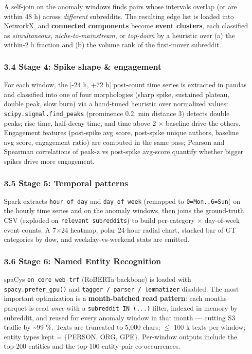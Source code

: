 \documentclass[
]{article}
\begin{document}
A self-join on the anomaly windows finds pairs whose intervals overlap
(or are within 48 h) across \emph{different} subreddits. The resulting
edge list is loaded into NetworkX, and \textbf{connected components}
become \textbf{event clusters}, each classified as \emph{simultaneous},
\emph{niche-to-mainstream}, or \emph{top-down} by a heuristic over (a)
the within-2 h fraction and (b) the volume rank of the first-mover
subreddit.

\subsubsection{3.4 Stage 4: Spike shape \& engagement }

For each window, the {[}-24 h, +72 h{]} post-count time series is
extracted in pandas and classified into one of four morphologies (sharp
spike, sustained plateau, double peak, slow burn) via a hand-tuned
heuristic over normalized values: \texttt{scipy.signal.find\_peaks}
(prominence 0.2, min distance 3) detects double peaks; rise time,
half-decay time, and time above 2 $\times$ baseline drive the others.
Engagement features (post-spike avg score, post-spike unique authors,
baseline avg score, engagement ratio) are computed in the same pass;
Pearson and Spearman correlations of peak-z vs post-spike avg-score
quantify whether bigger spikes drive more engagement.

\subsubsection{3.5 Stage 5: Temporal patterns}

Spark extracts \texttt{hour\_of\_day} and \texttt{day\_of\_week}
(remapped to \texttt{0=Mon..6=Sun}) on the hourly time series and on the
anomaly windows, then joins the ground-truth CSV (exploded on
\texttt{relevant\_subreddits}) to build per-category $\times$ day-of-week event
counts. A 7$\times$24 heatmap, polar 24-hour radial chart, stacked bar of GT
categories by dow, and weekday-vs-weekend stats are emitted.

\subsubsection{3.6 Stage 6: Named Entity Recognition}

spaCy\textquotesingle s \texttt{en\_core\_web\_trf} (RoBERTa backbone)
is loaded with \texttt{spacy.prefer\_gpu()} and
\texttt{tagger\ /\ parser\ /\ lemmatizer} disabled. The most important
optimization is a
\textbf{month-batched read pattern}: each month\textquotesingle s
parquet is read \emph{once} with a \texttt{subreddit\ IN\ (...)} filter,
indexed in memory by subreddit, and reused for every anomaly window in
that month --- cutting S3 traffic by \textasciitilde99 \%. Texts are
truncated to 5,000 chars; $\leq$ 100 k texts per window; entity types kept =
\{PERSON, ORG, GPE\}. Per-window outputs include the top-200 entities
and the top-100 entity-pair co-occurrences.
\end{document}
